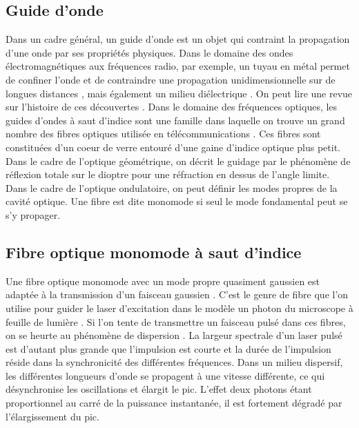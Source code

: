 \subsection{Guide d'onde}

Dans un cadre général, un guide d'onde est un objet qui contraint la propagation d'une onde par ses propriétés physiques. Dans le domaine des ondes électromagnétiques aux fréquences radio, par exemple, un tuyau en métal permet de confiner l'onde et de contraindre une propagation unidimensionnelle sur de longues distances \cite{miller_low-loss_1953}, mais également un milieu diélectrique \cite{unger_circular_1957}. On peut lire une revue sur l'histoire de ces découvertes \cite{packard_origin_1984}.
Dans le domaine des fréquences optiques, les guides d'ondes à saut d'indice sont une famille dans laquelle on trouve un grand nombre des fibres optiques utilisée en télécommunications \cite{maurer_glass_1973}. Ces fibres sont constituées d'un coeur de verre entouré d'une gaine d'indice optique plus petit. Dans le cadre de l'optique géométrique, on décrit le guidage par le phénomène de réflexion totale sur le dioptre pour une réfraction en dessus de l'angle limite. Dans le cadre de l'optique ondulatoire, on peut définir les modes propres de la cavité optique. Une fibre est dite monomode si seul le mode fondamental peut se s'y propager.

\subsection{Fibre optique monomode à saut d'indice} %

Une fibre optique monomode avec un mode propre quasiment gaussien est adaptée à la transmission d'un faisceau gaussien \cite{ankiewicz_generalized_1992}. C'est le genre de fibre que l'on utilise pour guider le laser d'excitation dans le modèle un photon du microscope à feuille de lumière \cite{migault_whole-brain_2018}. Si l'on tente de transmettre un faisceau pulsé dans ces fibres, on se heurte au phénomène de dispersion \cite{gloge_dispersion_1971} \cite{jurgensen_gaussian_1978}. La largeur spectrale d'un laser pulsé est d'autant plus grande que l'impulsion est courte et la durée de l'impulsion réside dans la synchronicité des différentes fréquences. Dans un milieu dispersif, les différentes longueurs d'onde se propagent à une vitesse différente, ce qui désynchronise les oscillations et élargit le pic. L'effet deux photons étant proportionnel au carré de la puissance instantanée, il est fortement dégradé par l'élargissement du pic. %


